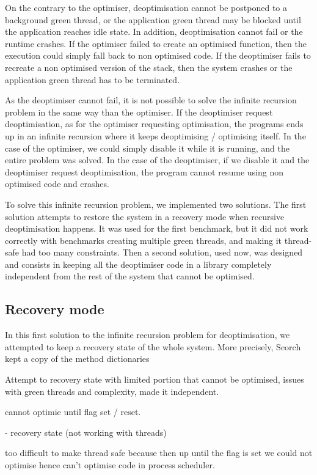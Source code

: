 \documentclass[a4paper,12pt,twoside]{../includes/ThesisStyle}
\begin{document}
On the contrary to the optimiser, deoptimisation cannot be postponed to a background green thread, or the application green thread may be blocked until the application reaches idle state. In addition, deoptimisation cannot fail or the runtime crashes. If the optimiser failed to create an optimised function, then the execution could simply fall back to non optimised code. If the deoptimiser fails to recreate a non optimised version of the stack, then the system crashes or the application green thread has to be terminated.

As the deoptimiser cannot fail, it is not possible to solve the infinite recursion problem in the same way than the optimiser. If the deoptimiser request deoptimisation, as for the optimiser requesting optimisation, the programs ends up in an infinite recursion where it keeps deoptimising / optimising itself. In the case of the optimiser, we could simply disable it while it is running, and the entire problem was solved. In the case of the deoptimiser, if we disable it and the deoptimiser request deoptimisation, the program cannot resume using non optimised code and crashes. 

To solve this infinite recursion problem, we implemented two solutions. The first solution attempts to restore the system in a recovery mode when recursive deoptimisation happens. It was used for the first benchmark, but it did not work correctly with benchmarks creating multiple green threads, and making it thread-safe had too many constraints. Then a second solution, used now, was designed and consists in keeping all the deoptimiser code in a library completely independent from the rest of the system that cannot be optimised.

\subsection{Recovery mode}

In this first solution to the infinite recursion problem for deoptimisation, we attempted to keep a recovery state of the whole system. More precisely, Scorch kept a copy of the method dictionaries

 Attempt to recovery state with limited portion that cannot be optimised, issues with green threads and complexity, made it independent.

cannot optimie until flag set / reset.

- recovery state (not working with threads)

too difficult to make thread safe because then up until the flag is set we could not optimise hence can't optimise code in process scheduler.
\end{document}
